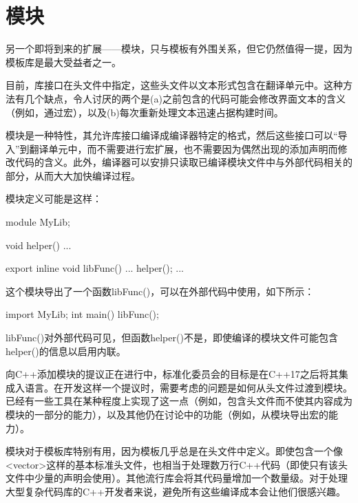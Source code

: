 \section{模块}
另一个即将到来的扩展——模块，只与模板有外围关系，但它仍然值得一提，因为模板库是最大受益者之一。

目前，库接口在头文件中指定，这些头文件以文本形式包含在翻译单元中。这种方法有几个缺点，令人讨厌的两个是(a)之前包含的代码可能会修改界面文本的含义（例如，通过宏），以及(b)每次重新处理文本迅速占据构建时间。

模块是一种特性，其允许库接口编译成编译器特定的格式，然后这些接口可以“导入”到翻译单元中，而不需要进行宏扩展，也不需要因为偶然出现的添加声明而修改代码的含义。此外，编译器可以安排只读取已编译模块文件中与外部代码相关的部分，从而大大加快编译过程。

模块定义可能是这样：

\begin{cpp}
module MyLib;

void helper() {
	...
}

export inline void libFunc() {
	...
	helper();
	...
}
\end{cpp}

这个模块导出了一个函数libFunc()，可以在外部代码中使用，如下所示：

\begin{cpp}
import MyLib;
int main() {
	libFunc();
}
\end{cpp}

libFunc()对外部代码可见，但函数helper()不是，即使编译的模块文件可能包含helper()的信息以启用内联。

向C++添加模块的提议正在进行中，标准化委员会的目标是在C++17之后将其集成入语言。在开发这样一个提议时，需要考虑的问题是如何从头文件过渡到模块。已经有一些工具在某种程度上实现了这一点（例如，包含头文件而不使其内容成为模块的一部分的能力），以及其他仍在讨论中的功能（例如，从模块导出宏的能力）。

模块对于模板库特别有用，因为模板几乎总是在头文件中定义。即使包含一个像<vector>这样的基本标准头文件，也相当于处理数万行C++代码（即使只有该头文件中少量的声明会使用）。其他流行库会将其代码量增加一个数量级。对于处理大型复杂代码库的C++开发者来说，避免所有这些编译成本会让他们很感兴趣。































